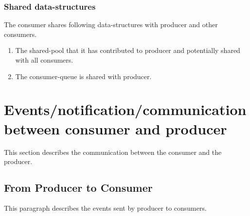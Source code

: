 \documentclass[a4paper,twoside]{report} %
\begin{document}
\subsubsection{Shared data-structures}
The consumer shares following data-structures with producer and other
consumers.
\begin{enumerate}
  \item The shared-pool that it has contributed to producer and
  potentially shared with all consumers. 
  \item The consumer-queue is shared with producer. 
\end{enumerate}



\section{Events/notification/communication between consumer and
producer}
This section describes the communication between the consumer and the
producer.  

\subsection{From Producer to Consumer}
This paragraph describes the events sent by producer to
consumers.
\end{document}

